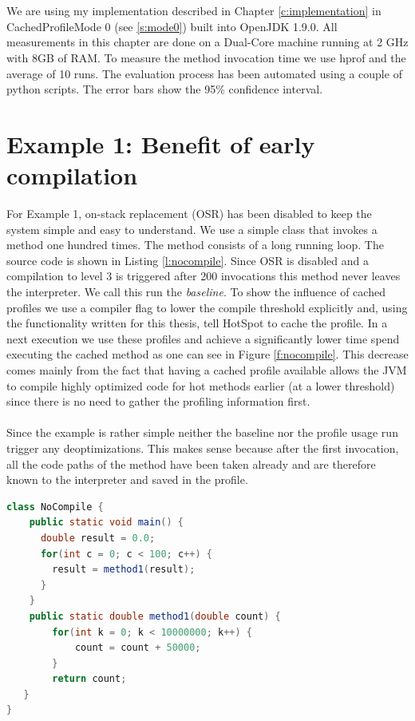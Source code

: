 \\\\
We are using my implementation described in Chapter \ref{c:implementation} in CachedProfileMode 0 (see \ref{s:mode0}) built into OpenJDK 1.9.0.
All measurements in this chapter are done on a Dual-Core machine running at 2 GHz with 8GB of RAM. To measure the method invocation time we use hprof \cite{hprof} and the average of 10 runs. The evaluation process has been automated using a couple of python scripts. The error bars show the 95\% confidence interval.
\section{Example 1: Benefit of early compilation}
\label{s:ex1}
For Example 1, on-stack replacement (OSR) has been disabled to keep the system simple and easy to understand.
We use a simple class that invokes a method one hundred times. The method consists of a long running loop. The source code is shown in Listing \ref{l:nocompile}.
Since OSR is disabled and a compilation to level 3 is triggered after 200 invocations this method never leaves the interpreter. We call this run the \textit{baseline}.
To show the influence of cached profiles we use a compiler flag to lower the compile threshold explicitly and, using the functionality written for this thesis, tell HotSpot to cache the profile.
In a next execution we use these profiles and achieve a significantly lower time spend executing the cached method as one can see in Figure \ref{f:nocompile}.
This decrease comes mainly from the fact that having a cached profile available allows the JVM to compile highly optimized code for hot methods earlier (at a lower threshold) since there is no need to gather the profiling information first.
\\\\
Since the example is rather simple neither the baseline nor the profile usage run trigger any deoptimizations. This makes sense because after the first invocation, all the code paths of the method have been taken already and are therefore known to the interpreter and saved in the profile.
\begin{lstlisting}[float,caption=Simple method that does not get compiled,label=l:nocompile,language=Java]
class NoCompile {
    public static void main() {
      double result = 0.0;
      for(int c = 0; c < 100; c++) {
        result = method1(result);
      }
    }
    public static double method1(double count) {
        for(int k = 0; k < 10000000; k++) {
            count = count + 50000;
        }
        return count;
   }
}
\end{lstlisting}
